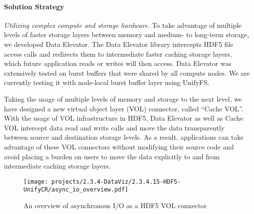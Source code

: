 \paragraph{Solution Strategy}

\textit{Utilizing complex compute and storage hardware. } 
To take advantage of multiple levels of faster storage layers between memory and medium- to long-term storage, we developed Data Elevator. The Data Elevator library intercepts HDF5 file access calls and redirects them to intermediate faster caching storage layers, which future application reads or writes will then access. Data Elevator was extensively tested on burst buffers that were shared by all compute nodes. We are currently testing it with node-local burst buffer layer using UnifyFS. 

Taking the usage of multiple levels of memory and storage to the next level, we have designed a new virtual object layer (VOL) connector, called ``Cache VOL''. With the usage of VOL infrastructure in HDF5, Data Elevator as well as Cache VOL intercept data read and write calls and move the data transparently between source and destination storage levels. As a result, applications can take advantage of these VOL connectors without modifying their source code and avoid placing a burden on users to move the data explicitly to and from intermediate caching storage layers.


\begin{wrapfigure}{r}{0.51\textwidth}
  \begin{center}
    \texttt{[image: projects/2.3.4-DataViz/2.3.4.15-HDF5-UnifyCR/async\_io\_overview.pdf]}
  \end{center}
  \caption{An overview of asynchronous I/O as a HDF5 VOL connector}
  \label{fig:asyncio-overview}
\end{wrapfigure}


